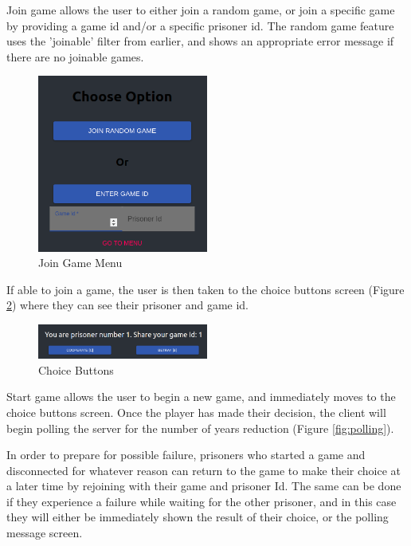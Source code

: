 \documentclass[12pt]{article}
\begin{document}
Join game allows the user to either join a random game, or join a specific game by providing a game id and/or a specific prisoner id. The random game feature uses the 'joinable' filter from earlier, and shows an appropriate error message if there are no joinable games. 

\begin{figure}[!ht]
        \centering
        \includegraphics[width=0.5\textwidth]{images/joingame} %
        \caption{Join Game Menu}
        \label{fig:joingame}
\end{figure}

If able to join a game, the user is then taken to the choice buttons screen (Figure \ref{fig:makechoice}) where they can see their prisoner and game id.

\begin{figure}[!ht]
        \centering
        \includegraphics[width=0.5\textwidth]{images/makechoice} %
        \caption{Choice Buttons}
        \label{fig:makechoice}
\end{figure}

Start game allows the user to begin a new game, and immediately moves to the choice buttons screen. Once the player has made their decision, the client will begin polling the server for the number of years reduction (Figure \ref{fig:polling}). 

In order to prepare for possible failure, prisoners who started a game and disconnected for whatever reason can return to the game to make their choice at a later time by rejoining with their game and prisoner Id. The same can be done if they experience a failure while waiting for the other prisoner, and in this case they will either be immediately shown the result of their choice, or the polling message screen.
\end{document}
